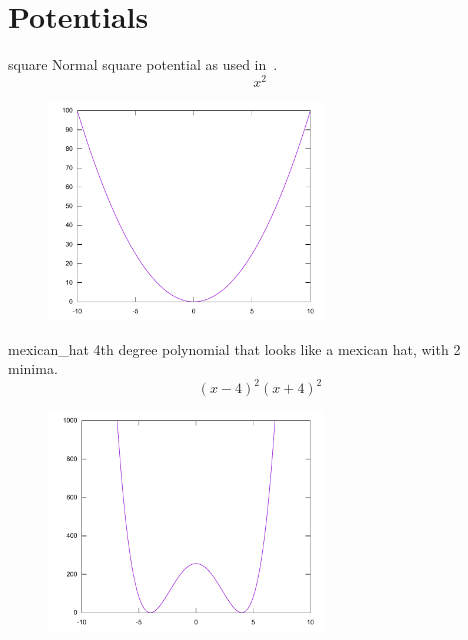 \documentclass[11pt,DIV=10,final]{scrreprt} %
\begin{document}
\section{Potentials}\label{sec:potentials}
\begin{description}
\begin{minipage}{\textwidth}
  \item[square] Normal square potential as used in~\cite{hall2013quantum}.
        \[
        x^{2}
        \]
        \begin{figure}[H]
          \centering
          \includegraphics[width=0.65\textwidth]{plots/square.pdf}
        \end{figure}
\end{minipage}
\begin{minipage}{\textwidth}
  \item[mexican\_hat] 4th degree polynomial that looks like a mexican hat, with 2 minima.
        \[
        (x-4)^{2}(x + 4)^{2}
        \]
        \begin{figure}[H]
          \centering
          \includegraphics[width=0.65\textwidth]{plots/mexican_hat.pdf}
        \end{figure}
\end{minipage}

\end{description}
\end{document}
